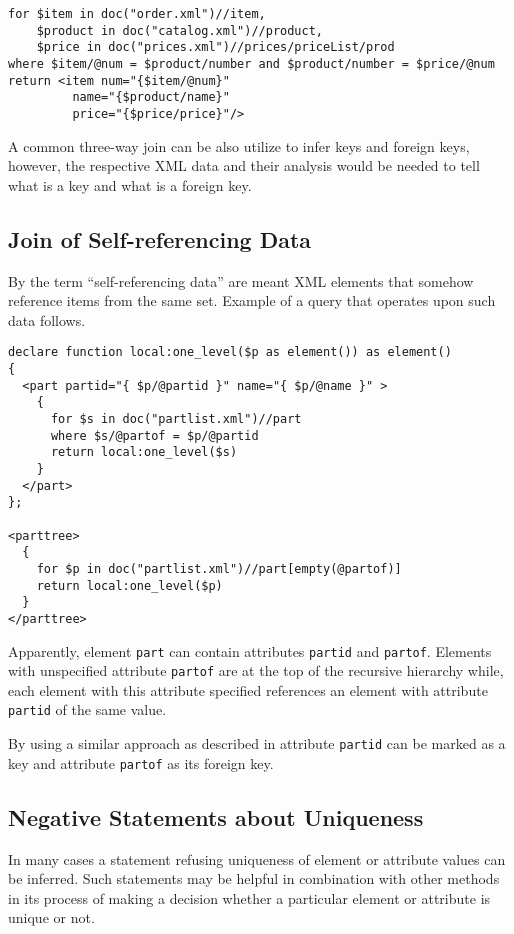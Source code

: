 \begin{verbatim}
for $item in doc("order.xml")//item, 
    $product in doc("catalog.xml")//product, 
    $price in doc("prices.xml")//prices/priceList/prod 
where $item/@num = $product/number and $product/number = $price/@num 
return <item num="{$item/@num}" 
         name="{$product/name}" 
         price="{$price/price}"/>
\end{verbatim}

A common three-way join can be also utilize to infer keys and foreign keys, however, the respective XML data and their analysis would be needed to tell what is a key and what is a foreign key.

\subsection{Join of Self-referencing Data}
By the term ``self-referencing data'' are meant XML elements that somehow reference items from the same set. Example of a query that operates upon such data follows.

\begin{verbatim}
declare function local:one_level($p as element()) as element()
{
  <part partid="{ $p/@partid }" name="{ $p/@name }" >
    {
      for $s in doc("partlist.xml")//part
      where $s/@partof = $p/@partid
      return local:one_level($s)
    }
  </part>
};

<parttree>
  {
    for $p in doc("partlist.xml")//part[empty(@partof)]
    return local:one_level($p)
  }
</parttree>
\end{verbatim}

Apparently, element \texttt{part} can contain attributes \texttt{partid} and \texttt{partof}. Elements with unspecified attribute \texttt{partof} are at the top of the recursive hierarchy while, each element with this attribute specified references an element with attribute \texttt{partid} of the same value.

By using a similar approach as described in \cite{Necasky:2009:DXK:1529282.1529414} attribute \texttt{partid} can be marked as a key and attribute \texttt{partof} as its foreign key.

\subsection{Negative Statements about Uniqueness} \label{Negative_uniqueness}
In many cases a statement refusing uniqueness of element or attribute values can be inferred. Such statements may be helpful in combination with other methods in its process of making a decision whether a particular element or attribute is unique or not.

